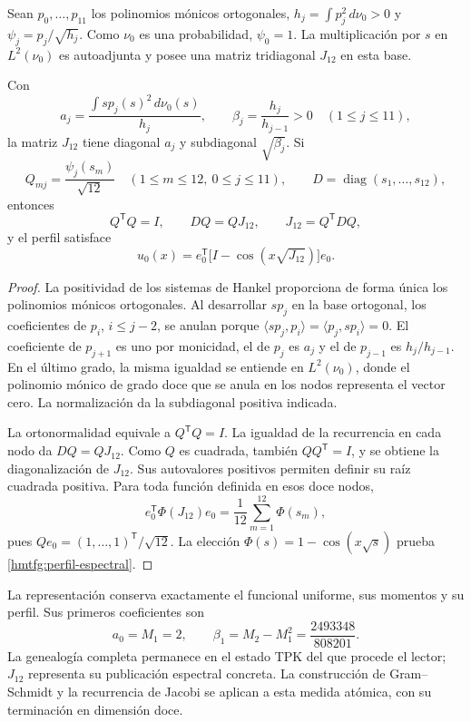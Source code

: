Sean \(p_0,\ldots,p_{11}\) los polinomios mónicos ortogonales,
\(h_j=\int p_j^2\,d\nu_0>0\) y
\(\psi_j=p_j/\sqrt{h_j}\). Como \(\nu_0\) es una probabilidad,
\(\psi_0=1\). La multiplicación por \(s\) en \(L^2(\nu_0)\)
es autoadjunta y posee una matriz tridiagonal \(J_{12}\) en esta base.

\begin{proposition}
\label{hmtfg:jacobi-entrelazamiento}
Con
\[
 a_j=\frac{\int s p_j(s)^2\,d\nu_0(s)}{h_j},\qquad
 \beta_j=\frac{h_j}{h_{j-1}}>0\quad(1\le j\le11),
\]
la matriz \(J_{12}\) tiene diagonal \(a_j\) y subdiagonal
\(\sqrt{\beta_j}\). Si
\[
 Q_{mj}=\frac{\psi_j(s_m)}{\sqrt{12}}
 \quad(1\le m\le12,\ 0\le j\le11),\qquad
 D=\operatorname{diag}(s_1,\ldots,s_{12}),
\]
entonces
\[
 Q^{\mathsf T}Q=I,\qquad DQ=QJ_{12},\qquad
 J_{12}=Q^{\mathsf T}DQ,
\]
y el perfil satisface
\begin{equation}
 u_0(x)=e_0^{\mathsf T}
          \bigl[I-\cos(x\sqrt{J_{12}})\bigr]e_0.
 \label{hmtfg:perfil-espectral}
\end{equation}
\end{proposition}
\begin{proof}
La positividad de los sistemas de Hankel proporciona de forma única
los polinomios mónicos ortogonales. Al desarrollar \(s p_j\) en la
base ortogonal, los coeficientes de \(p_i\), \(i\le j-2\), se
anulan porque
\(\langle sp_j,p_i\rangle=\langle p_j,sp_i\rangle=0\).
El coeficiente de \(p_{j+1}\) es uno por monicidad, el de \(p_j\)
es \(a_j\) y el de \(p_{j-1}\) es \(h_j/h_{j-1}\).
En el último grado, la misma igualdad se entiende en
\(L^2(\nu_0)\), donde el polinomio mónico de grado doce que se
anula en los nodos representa el vector cero. La normalización da
la subdiagonal positiva indicada.

La ortonormalidad equivale a \(Q^{\mathsf T}Q=I\). La igualdad
de la recurrencia en cada nodo da \(DQ=QJ_{12}\).
Como \(Q\) es cuadrada, también \(QQ^{\mathsf T}=I\), y se
obtiene la diagonalización de \(J_{12}\).
Sus autovalores positivos permiten definir su raíz cuadrada
positiva. Para toda función definida en esos doce nodos,
\[
 e_0^{\mathsf T}\Phi(J_{12})e_0
   =\frac1{12}\sum_{m=1}^{12}\Phi(s_m),
\]
pues \(Qe_0=(1,\ldots,1)^{\mathsf T}/\sqrt{12}\).
La elección \(\Phi(s)=1-\cos(x\sqrt{s})\) prueba
\eqref{hmtfg:perfil-espectral}.
\end{proof}

La representación conserva exactamente el funcional uniforme, sus
momentos y su perfil. Sus primeros coeficientes son
\[
 a_0=M_1=2,\qquad
 \beta_1=M_2-M_1^2=\frac{2493348}{808201}.
\]
La genealogía completa permanece en el estado TPK del que procede
el lector; \(J_{12}\) representa su publicación espectral concreta.
La construcción de Gram--Schmidt y la recurrencia de Jacobi se aplican
a esta medida atómica, con su terminación en dimensión doce.

